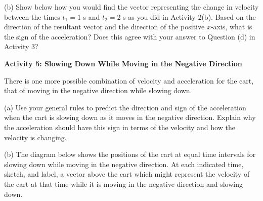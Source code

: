 (b) Show below how you would find the vector representing the change in velocity
between the times $t_1 = 1$ s and $t_2 = 2$ s as you did in Activity 2(b). Based on the 
direction of the resultant vector and the direction of the positive $x$-axis, 
what is the sign of the acceleration? Does this agree with your answer to Question (d) in Activity 3?
\vspace{20mm}

\textbf{Activity 5: Slowing Down While Moving in the Negative Direction}

There is one more possible combination of velocity and acceleration for the
cart, that of moving in the negative direction while slowing down. 


(a) Use your general rules to predict the direction and sign of the acceleration
when the cart is slowing down as it moves in the negative direction. Explain why the
acceleration should have this sign in terms of the velocity and how the 
velocity is changing. 
\answerspace{15mm}

(b) The diagram below shows the positions of the cart at equal time intervals
for slowing down while moving in the negative direction. At each indicated time, 
sketch, and label, a vector above the cart which might represent the velocity of the cart at that time while it is moving in the negative direction and slowing down.

